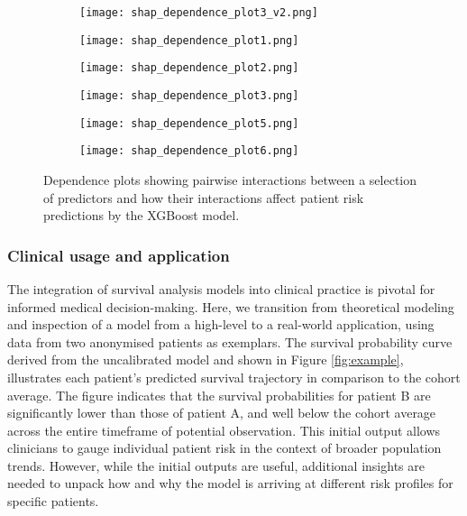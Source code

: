 \documentclass{article}
\begin{document}
\begin{figure}[hbt]
    \centering
    \begin{subfigure}[b]{0.34\textwidth}
        \texttt{[image: shap\_dependence\_plot3\_v2.png]}
        \caption{}
    \end{subfigure}%
    \begin{subfigure}[b]{0.34\textwidth}
        \texttt{[image: shap\_dependence\_plot1.png]}
        \caption{}
    \end{subfigure}%
    \begin{subfigure}[b]{0.34\textwidth}
        \texttt{[image: shap\_dependence\_plot2.png]}
        \caption{}
    \end{subfigure}%

    \begin{subfigure}[b]{0.34\textwidth}
        \texttt{[image: shap\_dependence\_plot3.png]}
        \caption{}
    \end{subfigure}%
    \begin{subfigure}[b]{0.34\textwidth}
        \texttt{[image: shap\_dependence\_plot5.png]}
        \caption{}
    \end{subfigure}%
    \begin{subfigure}[b]{0.34\textwidth}
        \texttt{[image: shap\_dependence\_plot6.png]}
        \caption{}
    \end{subfigure}%

    \caption{Dependence plots showing pairwise interactions between a selection of predictors and how their interactions affect patient risk predictions by the XGBoost model.}
    \label{fig:dependence}
\end{figure}


\subsubsection*{Clinical usage and application}

The integration of survival analysis models into clinical practice is pivotal for informed medical decision-making. Here, we transition from theoretical modeling and inspection of a model from a high-level to a real-world application, using data from two anonymised patients as exemplars. The survival probability curve derived from the uncalibrated model and shown in Figure \ref{fig:example}, illustrates each patient's predicted survival trajectory in comparison to the cohort average. The figure indicates that the survival probabilities for patient B are significantly lower than those of patient A, and well below the cohort average across the entire timeframe of potential observation. This initial output allows clinicians to gauge individual patient risk in the context of broader population trends. However, while the initial outputs are useful, additional insights are needed to unpack how and why the model is arriving at different risk profiles for specific patients.
\end{document}
